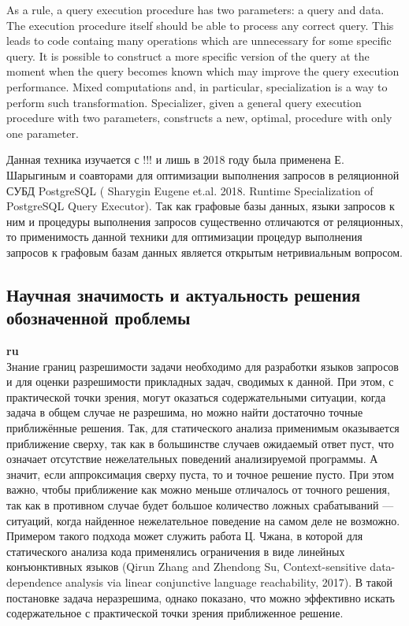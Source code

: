 \documentclass[12pt]{article}  %
\theoremstyle{remark}
\begin{document}
As a rule, a query execution procedure has two parameters: a query and data.
The execution procedure itself should be able to process any correct query.
This leads to code containg many operations which are unnecessary for some specific query.
It is possible to construct a more specific version of the query at the moment when the query becomes known which may improve the query execution performance.
Mixed computations and, in particular, specialization is a way to perform such transformation.
Specializer, given a general query execution procedure with two parameters, constructs a new, optimal, procedure with only one parameter.

Данная техника изучается с !!! и лишь в 2018 году была применена Е. Шарыгиным и соавторами для оптимизации выполнения запросов в реляционной СУБД PostgreSQL ( Sharygin Eugene et.al. 2018. Runtime Specialization of PostgreSQL Query Executor). Так как графовые базы данных, языки запросов к ним и процедуры выполнения запросов существенно отличаются от реляционных, то применимость данной техники для оптимизации процедур выполнения запросов к графовым базам данных является открытым нетривиальным вопросом.

\subsection{Научная значимость и актуальность решения обозначенной проблемы}

\textbf{ru}\\
%
Знание границ разрешимости задачи необходимо для разработки языков запросов и для оценки разрешимости прикладных задач, сводимых к данной.
При этом, с практической точки зрения, могут оказаться содержательными ситуации, когда задача в общем случае не разрешима, но можно найти достаточно точные приближённые решения.
Так, для статического анализа применимым  оказывается приближение сверху, так как в большинстве случаев ожидаемый ответ пуст, что означает отсутствие нежелательных поведений анализируемой программы.
А значит, если аппроксимация сверху пуста, то и точное решение пусто.
При этом важно, чтобы приближение как можно меньше отличалось от точного решения, так как в противном случае будет большое количество ложных срабатываний --- ситуаций, когда найденное нежелательное поведение на самом деле не возможно.
Примером такого подхода может служить работа Ц. Чжана, в которой для статического анализа кода применялись ограничения в виде линейных конъюнктивных языков (Qirun Zhang and Zhendong Su, Context-sensitive data-dependence analysis via linear conjunctive language reachability, 2017). В такой постановке задача неразрешима, однако показано, что можно эффективно искать содержательное с практической точки зрения приближенное решение.
\end{document}
